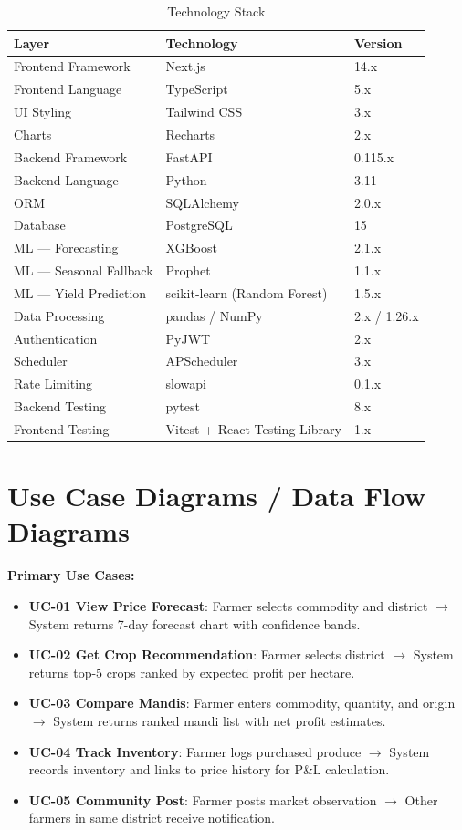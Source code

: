 \documentclass[12pt,a4paper]{report}
\begin{document}
\begin{table}[H]
\centering
\caption{Technology Stack}
\label{tab:techstack}
\begin{tabular}{|l|l|l|}
\hline
\textbf{Layer} & \textbf{Technology} & \textbf{Version} \\
\hline
Frontend Framework & Next.js & 14.x \\
Frontend Language & TypeScript & 5.x \\
UI Styling & Tailwind CSS & 3.x \\
Charts & Recharts & 2.x \\
Backend Framework & FastAPI & 0.115.x \\
Backend Language & Python & 3.11 \\
ORM & SQLAlchemy & 2.0.x \\
Database & PostgreSQL & 15 \\
ML --- Forecasting & XGBoost & 2.1.x \\
ML --- Seasonal Fallback & Prophet & 1.1.x \\
ML --- Yield Prediction & scikit-learn (Random Forest) & 1.5.x \\
Data Processing & pandas / NumPy & 2.x / 1.26.x \\
Authentication & PyJWT & 2.x \\
Scheduler & APScheduler & 3.x \\
Rate Limiting & slowapi & 0.1.x \\
Backend Testing & pytest & 8.x \\
Frontend Testing & Vitest + React Testing Library & 1.x \\
\hline
\end{tabular}
\end{table}

\section{Use Case Diagrams / Data Flow Diagrams}

\textbf{Primary Use Cases:}

\begin{itemize}
    \item \textbf{UC-01 View Price Forecast}: Farmer selects commodity and district
    $\rightarrow$ System returns 7-day forecast chart with confidence bands.
    \item \textbf{UC-02 Get Crop Recommendation}: Farmer selects district $\rightarrow$
    System returns top-5 crops ranked by expected profit per hectare.
    \item \textbf{UC-03 Compare Mandis}: Farmer enters commodity, quantity, and origin
    $\rightarrow$ System returns ranked mandi list with net profit estimates.
    \item \textbf{UC-04 Track Inventory}: Farmer logs purchased produce $\rightarrow$
    System records inventory and links to price history for P\&L calculation.
    \item \textbf{UC-05 Community Post}: Farmer posts market observation $\rightarrow$
    Other farmers in same district receive notification.
\end{itemize}
\end{document}
